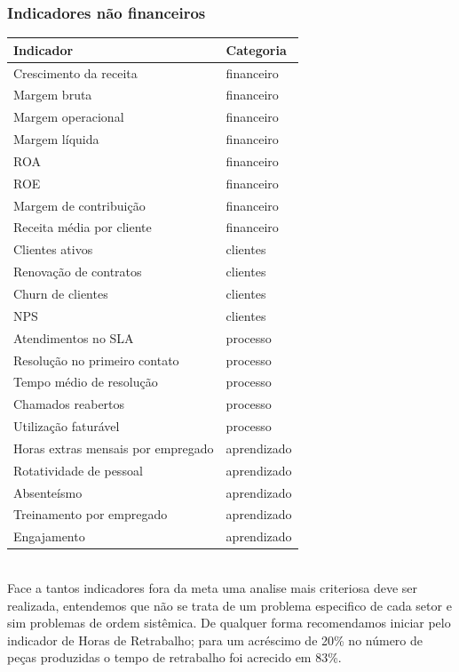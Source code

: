 \subsubsection{Indicadores não financeiros}
\hspace*{-2cm}                                                                 
 \begin{tabular}{p{4cm} l }                                                     
 \toprule                                                                       
   \textbf{Indicador} & \textbf{Categoria} \\
 \midrule
Crescimento da receita & financeiro \\
\midrule
Margem bruta & financeiro \\
\midrule
Margem operacional & financeiro \\
\midrule
Margem líquida & financeiro \\
\midrule
ROA & financeiro \\
\midrule
ROE & financeiro \\
\midrule
Margem de contribuição & financeiro \\
\midrule
Receita média por cliente & financeiro \\
\midrule
Clientes ativos & clientes \\
\midrule
Renovação de contratos & clientes \\
\midrule
Churn de clientes & clientes \\
\midrule
NPS & clientes \\
\midrule
Atendimentos no SLA & processo \\
\midrule
Resolução no primeiro contato & processo \\
\midrule
Tempo médio de resolução & processo \\
\midrule
Chamados reabertos & processo \\
\midrule
Utilização faturável & processo \\
\midrule
Horas extras mensais por empregado & aprendizado \\
\midrule
Rotatividade de pessoal  & aprendizado \\
\midrule
Absenteísmo  & aprendizado \\
\midrule
Treinamento por empregado  & aprendizado \\
\midrule
Engajamento & aprendizado \\
 \bottomrule                                                                    
 \end{tabular}\\
 Face a tantos indicadores fora da meta uma analise mais criteriosa deve ser realizada, entendemos que não se trata de um problema especifico de cada setor e sim problemas de ordem sistêmica. De qualquer forma recomendamos iniciar pelo indicador de Horas de Retrabalho; para um acréscimo de 20\% no número de peças produzidas o tempo de retrabalho foi acrecido em 83\%.

